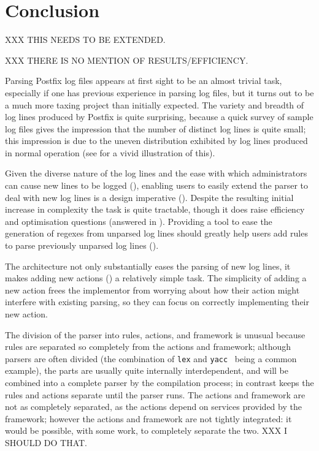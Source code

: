 \section{Conclusion}

\label{conclusion}

XXX THIS NEEDS TO BE EXTENDED\@.

XXX THERE IS NO MENTION OF RESULTS/EFFICIENCY\@.

Parsing Postfix log files appears at first sight to be an almost trivial
task, especially if one has previous experience in parsing log files, but
it turns out to be a much more taxing project than initially expected.  The
variety and breadth of log lines produced by Postfix is quite surprising,
because a quick survey of sample log files gives the impression that the
number of distinct log lines is quite small; this impression is due to the
uneven distribution exhibited by log lines produced in normal operation
(see  for a vivid illustration of this).


Given the diverse nature of the log lines and the ease with which
administrators can cause new lines to be logged (), enabling users to easily extend the parser to deal with new
log lines is a design imperative ().  Despite the
resulting initial increase in complexity the task is quite tractable,
though it does raise efficiency and optimisation questions (answered in
).  Providing a tool to ease the generation
of regexes from unparsed log lines should greatly help users add rules
to parse previously unparsed log lines ().


The architecture not only substantially eases the parsing of new log
lines, it makes adding new actions () a
relatively simple task.  The simplicity of adding a new action frees the
implementor from worrying about how their action might interfere with
existing parsing, so they can focus on correctly implementing their new
action.


The division of the parser into rules, actions, and framework is unusual
because rules are separated so completely from the actions and framework;
although parsers are often divided (the combination of \texttt{lex} and
\texttt{yacc}~\cite{lex-and-yacc-book} being a common example), the parts
are usually quite internally interdependent, and will be combined into a
complete parser by the compilation process; in contrast \parsername{} keeps
the rules and actions separate until the parser runs.  The actions and
framework are not as completely separated, as the actions depend on
services provided by the framework; however the actions and framework are
not tightly integrated: it would be possible, with some work, to completely
separate the two.  XXX I SHOULD DO THAT\@.


